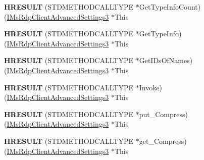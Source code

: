 \begin{DoxyCompactItemize}
{\bfseries H\+R\+E\+S\+U\+LT} (S\+T\+D\+M\+E\+T\+H\+O\+D\+C\+A\+L\+L\+T\+Y\+PE $\ast$Get\+Type\+Info\+Count)(\hyperlink{interface_m_s_t_s_c_lib_1_1_i_ms_rdp_client_advanced_settings3}{I\+Ms\+Rdp\+Client\+Advanced\+Settings3} $\ast$This
\item 
\mbox{\label{struct_m_s_t_s_c_lib_1_1_i_ms_rdp_client_advanced_settings3_vtbl_a1bc3a082b46ac69056d7415aca8b62f9}} 
{\bfseries H\+R\+E\+S\+U\+LT} (S\+T\+D\+M\+E\+T\+H\+O\+D\+C\+A\+L\+L\+T\+Y\+PE $\ast$Get\+Type\+Info)(\hyperlink{interface_m_s_t_s_c_lib_1_1_i_ms_rdp_client_advanced_settings3}{I\+Ms\+Rdp\+Client\+Advanced\+Settings3} $\ast$This
\item 
\mbox{\label{struct_m_s_t_s_c_lib_1_1_i_ms_rdp_client_advanced_settings3_vtbl_a201b6b2ddb6443c6b56795f9ab13f2fd}} 
{\bfseries H\+R\+E\+S\+U\+LT} (S\+T\+D\+M\+E\+T\+H\+O\+D\+C\+A\+L\+L\+T\+Y\+PE $\ast$Get\+I\+Ds\+Of\+Names)(\hyperlink{interface_m_s_t_s_c_lib_1_1_i_ms_rdp_client_advanced_settings3}{I\+Ms\+Rdp\+Client\+Advanced\+Settings3} $\ast$This
\item 
\mbox{\label{struct_m_s_t_s_c_lib_1_1_i_ms_rdp_client_advanced_settings3_vtbl_a5fc3bd761cdb9cf13ba4239c022cb6c5}} 
{\bfseries H\+R\+E\+S\+U\+LT} (S\+T\+D\+M\+E\+T\+H\+O\+D\+C\+A\+L\+L\+T\+Y\+PE $\ast$Invoke)(\hyperlink{interface_m_s_t_s_c_lib_1_1_i_ms_rdp_client_advanced_settings3}{I\+Ms\+Rdp\+Client\+Advanced\+Settings3} $\ast$This
\item 
\mbox{\label{struct_m_s_t_s_c_lib_1_1_i_ms_rdp_client_advanced_settings3_vtbl_a72c2102ccc1694bcc098e7b5e7e46ecf}} 
{\bfseries H\+R\+E\+S\+U\+LT} (S\+T\+D\+M\+E\+T\+H\+O\+D\+C\+A\+L\+L\+T\+Y\+PE $\ast$put\+\_\+\+Compress)(\hyperlink{interface_m_s_t_s_c_lib_1_1_i_ms_rdp_client_advanced_settings3}{I\+Ms\+Rdp\+Client\+Advanced\+Settings3} $\ast$This
\item 
\mbox{\label{struct_m_s_t_s_c_lib_1_1_i_ms_rdp_client_advanced_settings3_vtbl_a6bdc1dbd018016aecae38ce60fc73a92}} 
{\bfseries H\+R\+E\+S\+U\+LT} (S\+T\+D\+M\+E\+T\+H\+O\+D\+C\+A\+L\+L\+T\+Y\+PE $\ast$get\+\_\+\+Compress)(\hyperlink{interface_m_s_t_s_c_lib_1_1_i_ms_rdp_client_advanced_settings3}{I\+Ms\+Rdp\+Client\+Advanced\+Settings3} $\ast$This

\end{DoxyCompactItemize}
